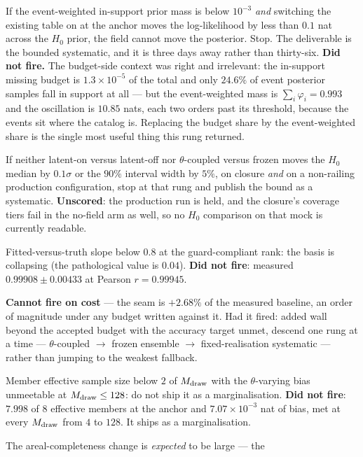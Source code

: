 \documentclass[11pt]{article}
\theoremstyle{definition}
\theoremstyle{remark}
\newcommand{\Mdraw}{M_{\rm draw}}
\begin{document}
\begin{description}[leftmargin=2.1em,style=nextline,itemsep=1pt]
\item[K0 (day 3).] If the event-weighted in-support prior mass is below $10^{-3}$
\emph{and} switching the existing table on at the anchor moves the log-likelihood by
less than $0.1$ nat across the $H_0$ prior, the field cannot move the posterior. Stop.
The deliverable is the bounded systematic, and it is three days away rather than
thirty-six. \textbf{Did not fire.} The budget-side context was right and
irrelevant: the in-support missing budget is $1.3\times10^{-5}$ of the total and
only $24.6\%$ of event posterior samples fall in support at all --- but the
event-weighted mass is $\sum_i\varphi_i=0.993$ and the oscillation is $10.85$
nats, each two orders past its threshold, because the events sit where the
catalog is. Replacing the budget share by the event-weighted share is the single
most useful thing this rung returned.
\item[K2.] If neither latent-on versus latent-off nor $\theta$-coupled versus frozen
moves the $H_0$ median by $0.1\sigma$ or the $90\%$ interval width by $5\%$, on
closure \emph{and} on a non-railing production configuration, stop at that rung and
publish the bound as a systematic. \textbf{Unscored}: the production run is held,
and the closure's coverage tiers fail in the no-field arm as well, so no $H_0$
comparison on that mock is currently readable.
\item[K3.] Fitted-versus-truth slope below $0.8$ at the guard-compliant rank: the
basis is collapsing (the pathological value is $0.04$). \textbf{Did not fire}:
measured $0.99908\pm0.00433$ at Pearson $r=0.99945$.
\item[K4.] \textbf{Cannot fire on cost} --- the seam is $+2.68\%$ of the measured
baseline, an order of magnitude under any budget written against it. Had it
fired: added wall beyond the accepted budget with the accuracy target unmet,
descend one rung at a time --- $\theta$-coupled $\to$ frozen ensemble $\to$
fixed-realisation systematic --- rather than jumping to the weakest fallback.
\item[K5.] Member effective sample size below $2$ of $\Mdraw$ with the
$\theta$-varying bias unmeetable at $\Mdraw\le128$: do not ship it as a
marginalisation. \textbf{Did not fire}: $7.998$ of $8$ effective members at the
anchor and $7.07\times10^{-3}$ nat of bias, met at every $\Mdraw$ from $4$ to
$128$. It ships as a marginalisation.
\item[K8.] The areal-completeness change is \emph{expected} to be large --- the

\end{description}
\end{document}
